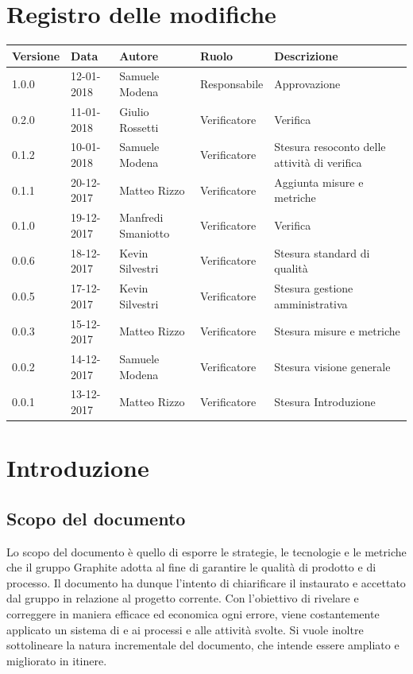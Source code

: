 \documentclass[openany,12pt,a4paper]{report}
\begin{document}
\chapter*{Registro delle modifiche}
\setlength\LTleft{-22mm}
\begin{longtable}{|p{20mm}|p{20mm}|p{40mm}|p{30mm}|p{50mm}|}
	\hline
	\textbf{Versione} & \textbf{Data} & \textbf{Autore} & \textbf{Ruolo} & \textbf{Descrizione} \\

		\hline 1.0.0 & 12-01-2018 & Samuele Modena & Responsabile & Approvazione \\
		\hline 0.2.0 & 11-01-2018 & Giulio Rossetti & Verificatore & Verifica \\
		\hline 0.1.2 & 10-01-2018 & Samuele Modena & Verificatore & Stesura resoconto delle attività di verifica \\
		\hline 0.1.1 & 20-12-2017 & Matteo Rizzo & Verificatore & Aggiunta misure e metriche \\
		\hline 0.1.0 & 19-12-2017 & Manfredi Smaniotto & Verificatore & Verifica \\		
		\hline 0.0.6 & 18-12-2017 & Kevin Silvestri & Verificatore & Stesura standard di qualità \\
		\hline 0.0.5 & 17-12-2017 & Kevin Silvestri & Verificatore & Stesura gestione amministrativa \\	
		\hline 0.0.3 & 15-12-2017 & Matteo Rizzo & Verificatore & Stesura misure e metriche \\
		\hline 0.0.2 & 14-12-2017 & Samuele Modena & Verificatore & Stesura visione generale \\
		\hline 0.0.1 & 13-12-2017 & Matteo Rizzo & Verificatore & Stesura Introduzione \\
		\hline
		
	\end{longtable}


\tableofcontents


\chapter{Introduzione}

    \section{Scopo del documento}
    
    Lo scopo del documento è quello di esporre le strategie, le tecnologie e le metriche che il gruppo Graphite adotta al fine di garantire le qualità di prodotto e di processo. Il documento ha dunque l'intento di chiarificare il  instaurato e accettato dal gruppo in relazione al progetto corrente. Con l'obiettivo di rivelare e correggere in maniera efficace ed economica ogni errore, viene costantemente applicato un sistema di  e  ai processi e alle attività svolte. Si vuole inoltre sottolineare la natura incrementale del documento, che intende essere ampliato e migliorato in itinere.
    
\end{document}
